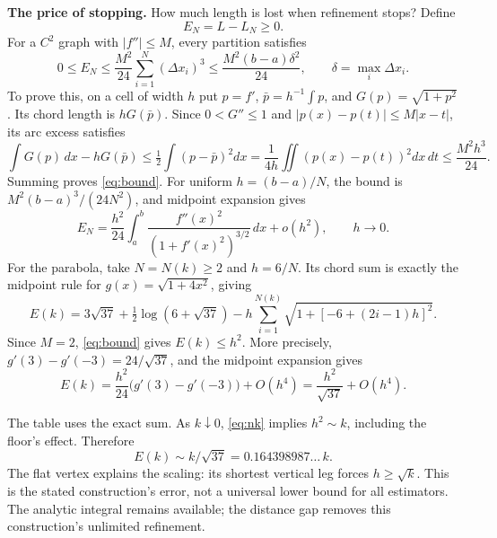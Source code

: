 \documentclass[11pt]{article}
\newcommand{\notesubsection}[1]{\par\addvspace{6pt}\noindent\textbf{#1.}\nobreakspace}
\begin{document}
\notesubsection{The price of stopping}
How much length is lost when refinement stops? Define
\begin{equation}\label{eq:error}
 E_N=L-L_N\ge0.
\end{equation}
For a $C^2$ graph with $|f''|\le M$, every partition satisfies
\begin{equation}\label{eq:bound}
 0\le E_N\le\frac{M^2}{24}\sum_{i=1}^N(\Delta x_i)^3
 \le\frac{M^2(b-a)\delta^2}{24},\qquad
 \delta=\max_i\Delta x_i.
\end{equation}
To prove this, on a cell of width $h$ put $p=f'$, $\bar p=h^{-1}\int p$,
and $G(p)=\sqrt{1+p^2}$. Its chord length is $hG(\bar p)$.
Since $0<G''\le1$ and $|p(x)-p(t)|\le M|x-t|$, its arc excess satisfies
\[
 \int G(p)\,dx-hG(\bar p)
 \le\tfrac12\int(p-\bar p)^2dx
 =\frac1{4h}\iint(p(x)-p(t))^2dx\,dt
 \le\frac{M^2h^3}{24}.
\]
Summing proves \eqref{eq:bound}. For uniform $h=(b-a)/N$, the bound
is $M^2(b-a)^3/(24N^2)$, and midpoint expansion gives
\begin{equation}\label{eq:generic-asymptotic}
 E_N=\frac{h^2}{24}\int_a^b
 \frac{f''(x)^2}{(1+f'(x)^2)^{3/2}}\,dx+o(h^2),
 \qquad h\to0.
\end{equation}
For the parabola, take $N=N(k)\ge2$ and $h=6/N$. Its chord sum is
exactly the midpoint rule for $g(x)=\sqrt{1+4x^2}$, giving
\begin{equation}\label{eq:exact-error}
 \boxed{E(k)=3\sqrt{37}+\tfrac12\log(6+\sqrt{37})
 -h\sum_{i=1}^{N(k)}\sqrt{1+[-6+(2i-1)h]^2}.}
\end{equation}
Since $M=2$, \eqref{eq:bound} gives $E(k)\le h^2$. More precisely,
$g'(3)-g'(-3)=24/\sqrt{37}$, and the midpoint expansion gives
\begin{equation}\label{eq:asymptotic}
 E(k)=\frac{h^2}{24}\bigl(g'(3)-g'(-3)\bigr)+O(h^4)
     =\frac{h^2}{\sqrt{37}}+O(h^4).
\end{equation}
\begin{center}
\small

\end{center}
The table uses the exact sum. As $k\downarrow0$, \eqref{eq:nk} implies
$h^2\sim k$, including the floor's effect. Therefore
\begin{equation}\label{eq:k-error}
 \boxed{E(k)\sim k/\sqrt{37}=0.164398987\ldots\,k.}
\end{equation}
The flat vertex explains the scaling: its shortest vertical leg forces
$h\ge\sqrt{k}$. This is the stated construction's error, not a universal
lower bound for all estimators. The analytic integral remains available;
the distance gap removes this construction's unlimited refinement.
\end{document}
